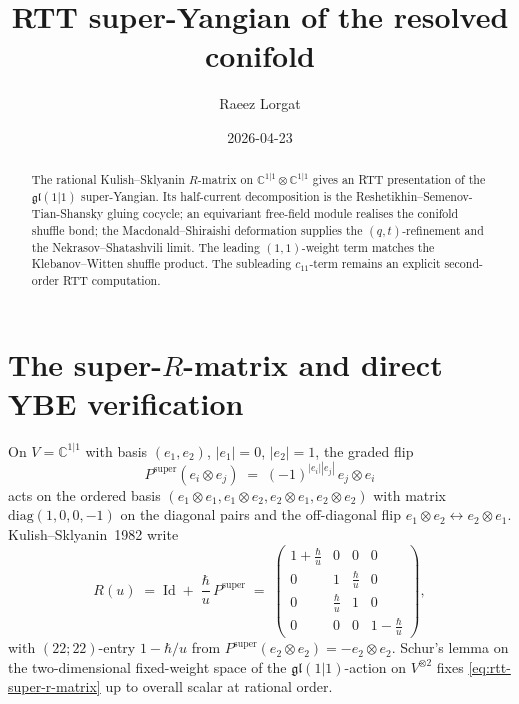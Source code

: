 \documentclass[11pt]{amsart}
\title{RTT super-Yangian of the resolved conifold}
\author{Raeez Lorgat}
\date{2026-04-23}
\theoremstyle{definition}
\providecommand{\bC}{\mathbb{C}}
\providecommand{\fgl}{\mathfrak{gl}}
\begin{document}
\maketitle

\begin{abstract}
\noindent The rational Kulish--Sklyanin \(R\)-matrix on
\(\bC^{1|1}\otimes\bC^{1|1}\) gives an RTT presentation of the
\(\fgl(1|1)\) super-Yangian. Its half-current decomposition is the
Reshetikhin--Semenov-Tian-Shansky gluing cocycle; an equivariant
free-field module realises the conifold shuffle bond; the
Macdonald--Shiraishi deformation supplies the \((q,t)\)-refinement and
the Nekrasov--Shatashvili limit. The leading \((1,1)\)-weight term
matches the Klebanov--Witten shuffle product. The subleading
\(c_{11}\)-term remains an explicit second-order RTT computation.
\end{abstract}

\section{The super-$R$-matrix and direct YBE verification}
\label{sec:R-matrix-direct}

On $V = \bC^{1|1}$ with basis $(e_1, e_2)$, $|e_1| = 0$, $|e_2| = 1$, the
graded flip
\[
  P^{\mathrm{super}}(e_i \otimes e_j)
  \;=\; (-1)^{|e_i||e_j|}\, e_j \otimes e_i
\]
acts on the ordered basis $(e_1 \otimes e_1, e_1 \otimes e_2,
e_2 \otimes e_1, e_2 \otimes e_2)$ with matrix
$\mathrm{diag}(1, 0, 0, -1)$ on the diagonal pairs and the off-diagonal
flip $e_1 \otimes e_2 \leftrightarrow e_2 \otimes e_1$.
Kulish--Sklyanin~1982 write
\begin{equation}\label{eq:rtt-super-r-matrix}
  R(u) \;=\; \mathrm{Id} \;+\; \frac{\hbar}{u}\, P^{\mathrm{super}}
  \;=\;
  \begin{pmatrix}
    1 + \tfrac{\hbar}{u} & 0 & 0 & 0 \\
    0 & 1 & \tfrac{\hbar}{u} & 0 \\
    0 & \tfrac{\hbar}{u} & 1 & 0 \\
    0 & 0 & 0 & 1 - \tfrac{\hbar}{u}
  \end{pmatrix},
\end{equation}
with $(22; 22)$-entry $1 - \hbar/u$ from $P^{\mathrm{super}}(e_2 \otimes e_2)
= -e_2 \otimes e_2$. Schur's lemma on the two-dimensional fixed-weight
space of the $\fgl(1|1)$-action on $V^{\otimes 2}$ fixes
\eqref{eq:rtt-super-r-matrix} up to overall scalar at rational order.
\end{document}
